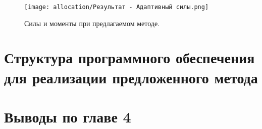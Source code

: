 \begin{figure}[ht]
    \centering
    \texttt{[image: allocation/Результат - Адаптивный силы.png]}
    \caption{Силы и моменты при предлагаемом методе.}
    \label{fig:mmt-300-allocation-optimal-force}
\end{figure}

\section{Структура программного обеспечения для реализации предложенного метода} \label{sec:Allocation/Software}


\section{Выводы по главе 4}